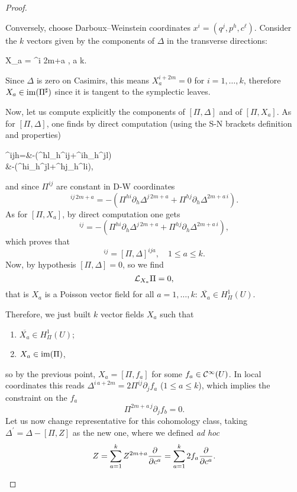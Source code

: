 \documentclass[main.tex]{subfiles}
\begin{document}
\begin{proof}
\begin{enumerate}
		Conversely, choose Darboux--Weinstein coordinates $x^i = (q^j, p^h, c^\ell)$. Consider the $k$ vectors given by the components of $\Delta$ in the transverse directions:
		\begin{eqalign}
			X_a = \Delta^{i\,\,2m+a} ,  \leq a \leq k.
		\end{eqalign}
		Since $\Delta$ is zero on Casimirs, this means $X_a^{i+2m} = 0$ for $i=1,\ldots,k$, therefore $X_a\in \operatorname{im}(\Pi^\sharp)$ since it is
		tangent to the symplectic leaves.

		Now, let us compute explicitly the components of $[\Pi, \Delta]$ and of $[\Pi, X_a]$.
		As for $[\Pi, \Delta]$, one finds by direct computation (using the S-N brackets definition and properties)
		\begin{eqalign}
		 [\Pi,\Delta]^{ijh}=&-(\Delta^{hl}\partial_h\Pi^{ij}+\Delta^{ih}\partial_h\Pi^{jl})	\\
				    &-(\Pi^{hi}\partial_h\Delta^{jl}+\Pi^{hj}\partial_h\Delta^{li}),
		\end{eqalign}
		and since $\Pi^{ij}$ are constant in D-W coordinates
		\begin{equation}
		 [\Pi,\Delta]^{ij\,2m+a}=-(\Pi^{hi}\partial_h\Delta^{j\,2m+a}+\Pi^{hj}\partial_h\Delta^{2m+a\,i}).
		\end{equation}
		As for $[\Pi, X_a]$, by direct computation one gets
		\begin{equation}
		 [\Pi,X_a]^{ij}=-(\Pi^{hi}\partial_{h}\Delta^{j\,2m+a}+\Pi^{hj}\partial_{h}\Delta^{2m+a\,i}),
		\end{equation}
		which proves that
		\begin{equation}
		 [\Pi,X_a]^{ij}=[\Pi,\Delta]^{ija},\quad  1 \leq a \leq k.
		\end{equation}
		Now, by hypothesis $[\Pi,\Delta]=0$, so we find
		\begin{equation}
		 \mathcal{L}_{X_a}\Pi=0,
		\end{equation}
		that is $X_a$ is a Poisson vector field for all $a=1,\ldots,k$: $\overline{X_a}\in H^1_\Pi(U)$.

		Therefore, we just built $k$ vector fields $X_a$ such that
		\begin{enumerate}
		 \item $\overline{X_a}\in H^1_\Pi(U)$;
		 \item $X_a\in\operatorname{im}(\Pi)$,
		\end{enumerate}
		so by the previous point, $X_a = [\Pi, f_a]$ for some $f_a \in \mathcal{C}^\infty(U)$.
		In local coordinates this reads $\Delta^{i\,a+2m} = 2\Pi^{ij}\partial_j f_a$ ($1 \leq a \leq k$),
		which implies the constraint on the $f_a$
		\begin{equation}
		 \Pi^{2m+a\,j}\partial_j f_b=0.
		\end{equation}
		Let us now change representative for this cohomology class, taking $\Delta^\prime=\Delta-[\Pi,Z]$ as the new one,
		where we defined \textit{ad hoc}
		\begin{equation}
		 Z=\sum_{a=1}^k Z^{2m+a}\frac{\partial {}}{\partial {c^a}}=\sum_{a=1}^k 2f_a\frac{\partial {}}{\partial {c^a}}.
		\end{equation}


\end{enumerate}
\end{proof}
\end{document}
